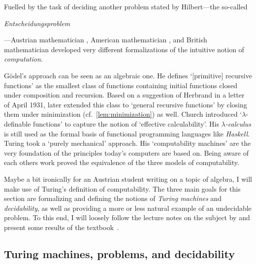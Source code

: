 %

Fuelled by the task of deciding another problem stated by Hilbert---the
so-called \begin{german}\emph{Entscheidungsproblem}\end{german}---Austrian
mathematician \textcite{Goedel1931}, American mathematician
\textcite{Church1936a,Church1936}, and British mathematician
\textcite{Turing1936} developed very different formalizations of the intuitive
notion of \emph{computation}.

Gödel's approach can be seen as an algebraic one. He defines ‘[primitive]
recursive functions’ as the smallest class of functions containing initial
functions closed under composition and recursion. Based on a suggestion of
Herbrand in a letter of April 1931, \textcite{Goedel1934} later extended this
class to ‘general recursive functions’ by closing them under minimization
(cf.~\cref{lem:minimization}) as well. Church introduced ‘\(λ\)-definable
functions’ to capture the notion of ‘effective calculability’. His
\emph{\(λ\)-calculus} is still used as the formal basis of functional
programming languages like \emph{Haskell}. Turing took a ‘purely mechanical’
approach. His ‘computability machines’ are the very foundation of the principles
today's computers are based on. Being aware of each others work
\textcite{Church1936,Kleene1936,Turing1936} proved the equivalence of the three
models of computability.

Maybe a bit ironically for an Austrian student writing on a topic of algebra, I
will make use of Turing's definition of computability. The three main goals for
this section are formalizing and defining the notions of \emph{Turing machines}
and \emph{decidability}, as well as providing a more or less natural example of
an undecidable problem. To this end, I will loosely follow the lecture notes on
the subject by \textcite{Mueller2016} and present some results of the
textbook~\cite{Cooper2004}.

\subsection{Turing machines, problems, and decidability}

